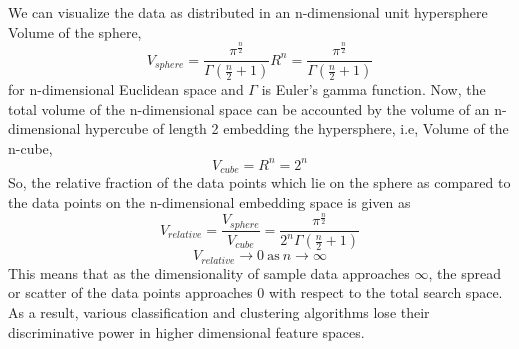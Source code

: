 \documentclass[11pt,a4paper]{article}
\begin{document}
We can visualize the data as distributed in an n-dimensional unit hypersphere \\
Volume of the sphere, 
\begin{equation}
{V}_{sphere} = \frac{\pi^{\frac{n}{2}}}{\Gamma(\frac{n}{2}+1)}R^{n} = \frac{\pi^{\frac{n}{2}}}{\Gamma(\frac{n}{2}+1)}
\end{equation}
for n-dimensional Euclidean space and $\Gamma$ is Euler's gamma function. Now, the total volume of the n-dimensional space can be accounted by the volume of an n-dimensional hypercube of length 2 embedding the hypersphere, i.e, Volume of the n-cube, 
\begin{equation}
{V}_{cube} = {R}^{n} = 2^n
\end{equation} 
So, the relative fraction of the data points which lie on the sphere as compared to the data points on the n-dimensional embedding space is given as
\begin{equation}
{V}_{relative} = \frac{{V}_{sphere}}{{V}_{cube}} = \frac{\pi^{\frac{n}{2}}}{{2}^{n}\Gamma(\frac{n}{2}+1)}
\end{equation}
\begin{equation}
{V}_{relative} \to 0 ~\text{as}~ n \to \infty
\end{equation} 
This means that as the dimensionality of sample data approaches $\infty$, the spread or scatter of the data points approaches 0 with respect to the total search space. As a result, various classification and clustering algorithms lose their discriminative power in higher dimensional feature spaces.   
\end{document}
